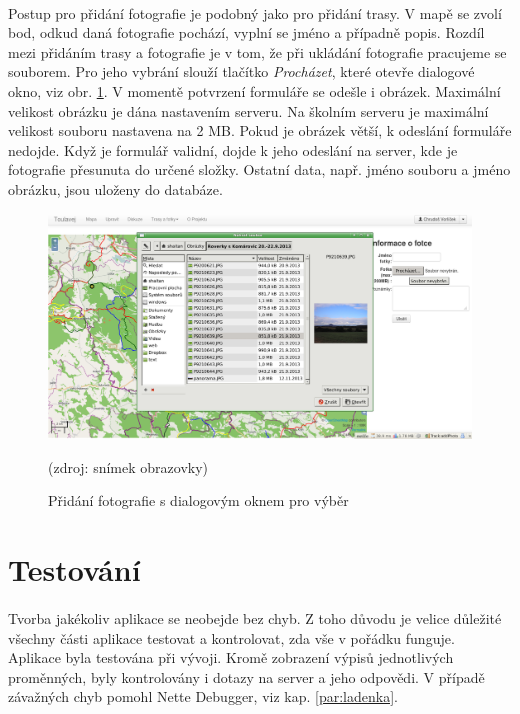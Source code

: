 \documentclass[11pt,a4paper,titlepage,oneside]{book}
\begin{document}
		
			\paragraph{}Postup pro přidání fotografie je podobný jako pro přidání trasy. V mapě se zvolí bod, odkud daná fotografie pochází, vyplní se jméno a případně popis. Rozdíl mezi přidáním trasy a fotografie je v tom, že při ukládání fotografie pracujeme se souborem. Pro jeho vybrání slouží tlačítko \textit{Procházet}, které otevře dialogové okno, viz obr. \ref{fig:addImage}. V momentě potvrzení formuláře se odešle i obrázek. Maximální velikost obrázku je dána nastavením serveru. Na školním serveru je maximální velikost souboru nastavena na 2 MB. Pokud je obrázek větší, k odeslání formuláře nedojde. Když je formulář validní, dojde k jeho odeslání na server, kde je fotografie přesunuta do určené složky. Ostatní data, např. jméno souboru a jméno obrázku, jsou uloženy do databáze.
		\begin{figure}[!h]
			\begin{center}
				\includegraphics[width=12cm]{obrazky/toulavej/addImage.png}
				\caption{Přidání fotografie s dialogovým oknem pro výběr}
				\label{fig:addImage}
				(zdroj: snímek obrazovky)
			\end{center}
		\end{figure}


		\section{Testování}
		\paragraph{} Tvorba jakékoliv aplikace se neobejde bez chyb. Z toho důvodu je velice důležité všechny části aplikace testovat a kontrolovat, zda vše v pořádku funguje. Aplikace  byla testována při vývoji. Kromě zobrazení výpisů jednotlivých proměnných, byly kontrolovány i dotazy na server a jeho odpovědi. V případě závažných chyb pomohl Nette Debugger, viz kap. \ref{par:ladenka}.
\end{document}
